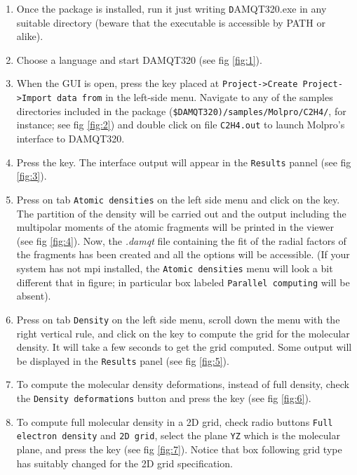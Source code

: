 \documentclass[a4paper,10pt]{article}
\begin{document}
\begin{enumerate}

\item Once the package is installed, run it just writing {\texttt DAMQT320.exe} in any
suitable directory (beware that the executable is accessible by PATH or alike).

\item Choose a language and start DAMQT320 (see fig \ref{fig:1}).

\item When the GUI is open, press the \teclapuntos key placed at
\texttt{Project->Create Project->Import data from} in the left-side menu. Navigate to any
of the samples directories included in the package 
(\texttt{\$DAMQT320)/samples/Molpro/C2H4/}, for
instance; see fig \ref{fig:2}) and double click on file \texttt{C2H4.out}
to launch Molpro's interface to DAMQT320.

\item Press the \exec key. The interface output will appear in the \texttt{Results} pannel 
(see fig \ref{fig:3}).

\item Press on tab \texttt{Atomic densities} on the left side menu and click on
the \exec key. The partition of the density will be carried out and the output
including the multipolar moments of the atomic fragments will be printed in the
viewer (see fig \ref{fig:4}). Now, the {\it .damqt} file containing the fit of the
radial factors of the fragments has been created and all the options will be
accessible. (If your system has not mpi installed, the \texttt{Atomic densities}
menu will look a bit different that in figure; in particular
box labeled \texttt{Parallel computing} will be absent).

\item Press on tab \texttt{Density} on the left side menu, scroll down the menu
with the right vertical rule, and click on
the \exec key to compute the grid for the molecular density. It will take a
few seconds to get the grid computed. Some output will be displayed in the \texttt{Results}
panel (see fig \ref{fig:5}).

\item To compute the molecular density deformations, instead of full density,
check the \texttt{Density deformations} button and press
the \exec key  (see fig \ref{fig:6}).

\item To compute full molecular density in a 2D grid, check radio buttons
\texttt{Full electron density} and \texttt{2D grid},
select the plane \texttt{YZ} which is the molecular plane, and press 
the \exec key  (see fig \ref{fig:7}).
Notice that box following grid type has suitably changed for the 2D grid 
specification.


\end{enumerate}
\end{document}
